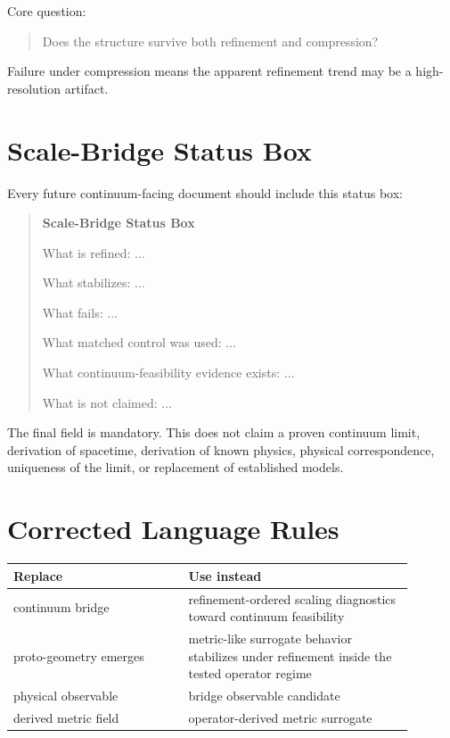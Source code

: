 \documentclass[11pt]{article}
\begin{document}
Core question:
\begin{quote}
Does the structure survive both refinement and compression?
\end{quote}

Failure under compression means the apparent refinement trend may be a high-resolution artifact.

\section{Scale-Bridge Status Box}

Every future continuum-facing document should include this status box:

\begin{quote}
\textbf{Scale-Bridge Status Box}

What is refined: \(\ldots\)

What stabilizes: \(\ldots\)

What fails: \(\ldots\)

What matched control was used: \(\ldots\)

What continuum-feasibility evidence exists: \(\ldots\)

What is not claimed: \(\ldots\)
\end{quote}

The final field is mandatory. This does not claim a proven continuum limit, derivation of spacetime, derivation of known physics, physical correspondence, uniqueness of the limit, or replacement of established models.

\section{Corrected Language Rules}

\begin{longtable}{p{0.39\linewidth}p{0.50\linewidth}}
\toprule
Replace & Use instead \\
\midrule
continuum bridge & refinement-ordered scaling diagnostics toward continuum feasibility \\
proto-geometry emerges & metric-like surrogate behavior stabilizes under refinement inside the tested operator regime \\
physical observable & bridge observable candidate \\
derived metric field & operator-derived metric surrogate \\
\bottomrule
\end{longtable}
\end{document}
